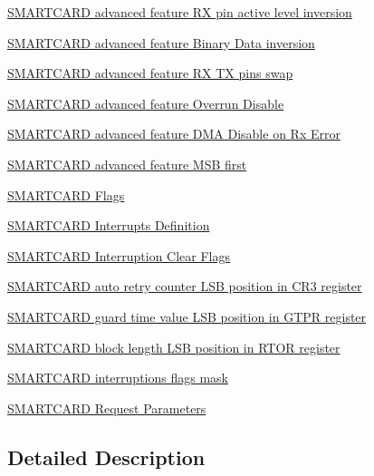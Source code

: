 \begin{DoxyCompactItemize}
\hyperlink{group___s_m_a_r_t_c_a_r_d___rx___inv}{S\+M\+A\+R\+T\+C\+A\+R\+D advanced feature R\+X pin active level inversion}
\item 
\hyperlink{group___s_m_a_r_t_c_a_r_d___data___inv}{S\+M\+A\+R\+T\+C\+A\+R\+D advanced feature Binary Data inversion}
\item 
\hyperlink{group___s_m_a_r_t_c_a_r_d___rx___tx___swap}{S\+M\+A\+R\+T\+C\+A\+R\+D advanced feature R\+X T\+X pins swap}
\item 
\hyperlink{group___s_m_a_r_t_c_a_r_d___overrun___disable}{S\+M\+A\+R\+T\+C\+A\+R\+D advanced feature Overrun Disable}
\item 
\hyperlink{group___s_m_a_r_t_c_a_r_d___d_m_a___disable__on___rx___error}{S\+M\+A\+R\+T\+C\+A\+R\+D advanced feature D\+M\+A Disable on Rx Error}
\item 
\hyperlink{group___s_m_a_r_t_c_a_r_d___m_s_b___first}{S\+M\+A\+R\+T\+C\+A\+R\+D advanced feature M\+S\+B first}
\item 
\hyperlink{group___s_m_a_r_t_c_a_r_d___flags}{S\+M\+A\+R\+T\+C\+A\+R\+D Flags}
\item 
\hyperlink{group___s_m_a_r_t_c_a_r_d___interrupt__definition}{S\+M\+A\+R\+T\+C\+A\+R\+D Interrupts Definition}
\item 
\hyperlink{group___s_m_a_r_t_c_a_r_d___i_t___c_l_e_a_r___flags}{S\+M\+A\+R\+T\+C\+A\+R\+D Interruption Clear Flags}
\item 
\hyperlink{group___s_m_a_r_t_c_a_r_d___c_r3___s_c_a_r_c_n_t___l_s_b___p_o_s}{S\+M\+A\+R\+T\+C\+A\+R\+D auto retry counter L\+S\+B position in C\+R3 register}
\item 
\hyperlink{group___s_m_a_r_t_c_a_r_d___g_t_p_r___g_t___l_s_b___p_o_s}{S\+M\+A\+R\+T\+C\+A\+R\+D guard time value L\+S\+B position in G\+T\+P\+R register}
\item 
\hyperlink{group___s_m_a_r_t_c_a_r_d___r_t_o_r___b_l_e_n___l_s_b___p_o_s}{S\+M\+A\+R\+T\+C\+A\+R\+D block length L\+S\+B position in R\+T\+O\+R register}
\item 
\hyperlink{group___s_m_a_r_t_c_a_r_d___interruption___mask}{S\+M\+A\+R\+T\+C\+A\+R\+D interruptions flags mask}
\item 
\hyperlink{group___s_m_a_r_t_c_a_r_d___request___parameters}{S\+M\+A\+R\+T\+C\+A\+R\+D Request Parameters}
\end{DoxyCompactItemize}


\subsection{Detailed Description}

